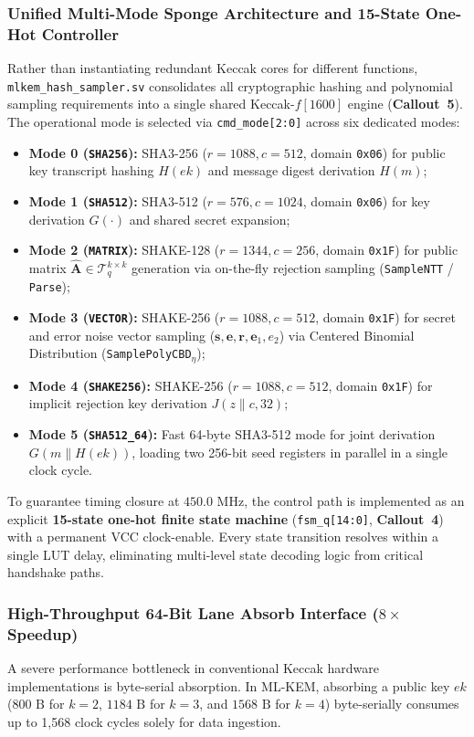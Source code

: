 \subsubsection{Unified Multi-Mode Sponge Architecture and 15-State One-Hot Controller}
Rather than instantiating redundant Keccak cores for different functions, \texttt{mlkem\_hash\_sampler.sv} consolidates all cryptographic hashing and polynomial sampling requirements into a single shared Keccak-$f[1600]$ engine (\textbf{Callout~5}). The operational mode is selected via \texttt{cmd\_mode[2:0]} across six dedicated modes:
\begin{itemize}
    \item \textbf{Mode 0 (\texttt{SHA256}):} SHA3-256 ($r=1088, c=512$, domain \texttt{0x06}) for public key transcript hashing $H(ek)$ and message digest derivation $H(m)$;
    \item \textbf{Mode 1 (\texttt{SHA512}):} SHA3-512 ($r=576, c=1024$, domain \texttt{0x06}) for key derivation $G(\cdot)$ and shared secret expansion;
    \item \textbf{Mode 2 (\texttt{MATRIX}):} SHAKE-128 ($r=1344, c=256$, domain \texttt{0x1F}) for public matrix $\hat{\mathbf{A}} \in \mathcal{T}_q^{k \times k}$ generation via on-the-fly rejection sampling (\texttt{SampleNTT} / \texttt{Parse});
    \item \textbf{Mode 3 (\texttt{VECTOR}):} SHAKE-256 ($r=1088, c=512$, domain \texttt{0x1F}) for secret and error noise vector sampling ($\mathbf{s}, \mathbf{e}, \mathbf{r}, \mathbf{e}_1, e_2$) via Centered Binomial Distribution (\texttt{SamplePolyCBD}$_\eta$);
    \item \textbf{Mode 4 (\texttt{SHAKE256}):} SHAKE-256 ($r=1088, c=512$, domain \texttt{0x1F}) for implicit rejection key derivation $J(z \parallel c, 32)$;
    \item \textbf{Mode 5 (\texttt{SHA512\_64}):} Fast 64-byte SHA3-512 mode for joint derivation $G(m \parallel H(ek))$, loading two 256-bit seed registers in parallel in a single clock cycle.
\end{itemize}

To guarantee timing closure at $450.0\text{ MHz}$, the control path is implemented as an explicit \textbf{15-state one-hot finite state machine} (\texttt{fsm\_q[14:0]}, \textbf{Callout~4}) with a permanent VCC clock-enable. Every state transition resolves within a single LUT delay, eliminating multi-level state decoding logic from critical handshake paths.

\subsubsection{High-Throughput 64-Bit Lane Absorb Interface (\texorpdfstring{$8\times$}{8x} Speedup)}
A severe performance bottleneck in conventional Keccak hardware implementations is byte-serial absorption. In \mbox{ML-KEM}, absorbing a public key $ek$ ($800\text{ B}$ for $k=2$, $1184\text{ B}$ for $k=3$, and $1568\text{ B}$ for $k=4$) byte-serially consumes up to 1,568 clock cycles solely for data ingestion.

